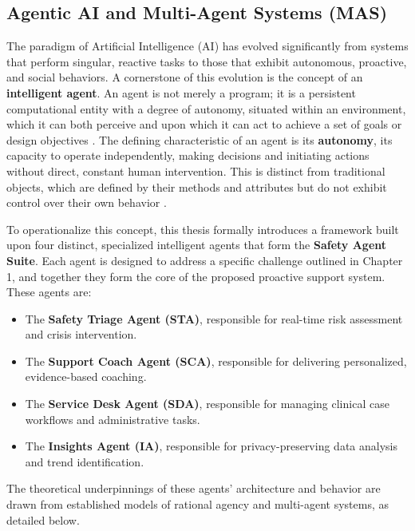 \subsection{Agentic AI and Multi-Agent Systems (MAS)}
\label{subsec:agentic_ai}

The paradigm of Artificial Intelligence (AI) has evolved significantly from systems that perform singular, reactive tasks to those that exhibit autonomous, proactive, and social behaviors. A cornerstone of this evolution is the concept of an \textbf{intelligent agent}. An agent is not merely a program; it is a persistent computational entity with
a degree of autonomy, situated within an environment, which it can both perceive and upon which it can act to achieve a set of goals or design objectives \cite{wooldridge1995intelligentagents}. The defining characteristic of an agent is its \textbf{autonomy}, its capacity to operate independently, making decisions and initiating actions without direct, constant human intervention. This is distinct from traditional objects, which are defined by their methods and attributes but do not exhibit control over their own behavior \cite{wooldridge2009introductionmas}.

To operationalize this concept, this thesis formally introduces a framework built upon four distinct, specialized intelligent agents that form the \textbf{Safety Agent Suite}. Each agent is designed to address a specific challenge outlined in Chapter 1, and together they form the core of the proposed proactive support system. These agents are:
\begin{itemize}
    \item The \textbf{Safety Triage Agent (STA)}, responsible for real-time risk assessment and crisis intervention.
    \item The \textbf{Support Coach Agent (SCA)}, responsible for delivering personalized, evidence-based coaching.
    \item The \textbf{Service Desk Agent (SDA)}, responsible for managing clinical case workflows and administrative tasks.
    \item The \textbf{Insights Agent (IA)}, responsible for privacy-preserving data analysis and trend identification.
\end{itemize}

The theoretical underpinnings of these agents' architecture and behavior are drawn from established models of rational agency and multi-agent systems, as detailed below.

